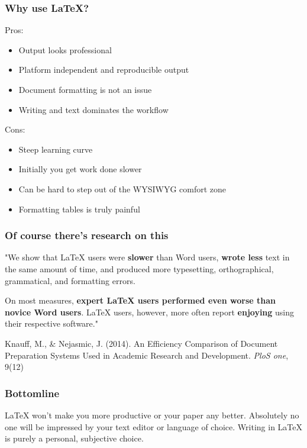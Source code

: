 \documentclass{beamer}
\begin{document}
\begin{frame}
	\frametitle{Why use LaTeX?}
	Pros:
	\begin{itemize}
		\item Output looks professional \pause
		\item Platform independent and reproducible output \pause
		\item Document formatting is not an issue \pause
		\item Writing and text dominates the workflow \pause
	\end{itemize}
	\medskip

	Cons:
	\begin{itemize}
		\item Steep learning curve \pause
		\item Initially you get work done slower \pause
		\item Can be hard to step out of the WYSIWYG comfort zone \pause
		\item Formatting tables is truly painful
	\end{itemize}
\end{frame}



\begin{frame}
	\frametitle{Of course there's research on this}
	"We show that LaTeX users were \textbf{slower} than Word users, \textbf{wrote less} text in the same amount of time, and produced more typesetting, orthographical, grammatical, and formatting errors.
	\medskip 
	
	On most measures, \textbf{expert LaTeX users performed even worse than novice Word users}. LaTeX users, however, more often report \textbf{enjoying} using their respective software." 
	\bigskip
	
	{\footnotesize Knauff, M., & Nejasmic, J. (2014). An Efficiency Comparison of Document Preparation Systems Used in Academic Research and Development. \textit{PloS one}, 9(12)\par}
\bigskip
\end{frame}





\begin{frame}
\frametitle{Bottomline}
LaTeX won't make you more productive or your paper any better. Absolutely no one will be impressed by your text editor or language of choice. Writing in LaTeX is purely a personal, subjective choice.
\end{frame}
\end{document}
